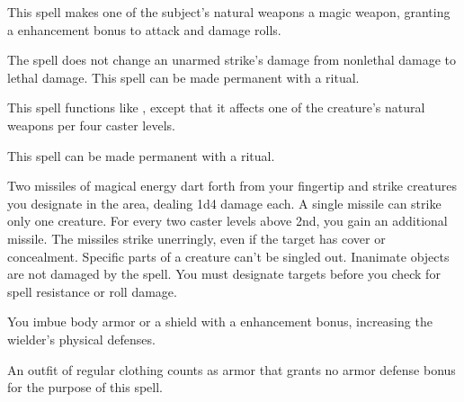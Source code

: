 \spellrng{\rngclose}
\spelldur{\durshort}
\begin{spelleffect}
  This spell makes one of the subject's natural weapons a  magic weapon, granting a  enhancement bonus to attack and damage rolls. \spellbonusscalingdescription
\end{spelleffect}
\begin{spellnotes}
  The spell does not change an unarmed strike's damage from nonlethal damage to lethal damage. This spell can be made permanent with a  ritual.
\end{spellnotes}

\begin{spelleffect}
  This spell functions like , except that it affects one of the creature's natural weapons per four caster levels.
\end{spelleffect}
\begin{spellnotes}
This spell can be made permanent with a  ritual.
\end{spellnotes}

\spellrng{\rngclose}
\begin{spelleffect}
  Two missiles of magical energy dart forth from your fingertip and strike creatures you designate in the area, dealing 1d4 damage each. A single missile can strike only one creature. For every two caster levels above 2nd, you gain an additional missile.
  The missiles strike unerringly, even if the target has cover or concealment. Specific parts of a creature can't be singled out. Inanimate objects are not damaged by the spell. You must designate targets before you check for spell resistance or roll damage.
\end{spelleffect}

\spellrng{\rngclose}
\spelldur{\durmed}
\begin{spelleffect}
  You imbue body armor or a shield with a  enhancement bonus, increasing the wielder's physical defenses. \spellbonusscalingdescription
\end{spelleffect}
\begin{spellnotes}
  An outfit of regular clothing counts as armor that grants no armor defense bonus for the purpose of this spell.
\end{spellnotes}

